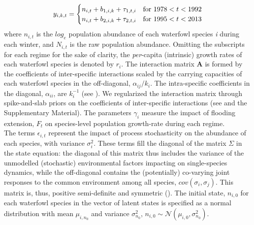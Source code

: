 \documentclass[12pt]{article}
\begin{document}
\begin{equation}\label{LVR_Obs_Equation_form}
	y_{i,k,t} = 
	\begin{cases}
		n_{i,t} + b_{1,i,k} + \tau_{1,t,i} & \text{for $ 1978 < t < 1992 $}\\
		n_{i,t} + b_{2,i,k} + \tau_{2,t,i} & \text{for $ 1995 < t < 2013 $}\\
	\end{cases}
\end{equation}
where $ n_{i,t} $ is the $log_{e}$ population abundance of each waterfowl species \textit{i} during each winter, and $ N_{i,t} $ is the raw population abundance. Omitting the subscripts for each regime for the sake of clarity, the \textit{per}-capita (intrinsic) growth rates of each waterfowl species is denoted by $ r_{i} $. The interaction matrix $ \mathbf{A} $ is formed by the coefficients of inter-specific interactions scaled by the carrying capacities of each waterfowl species in the off-diagonal, $ \alpha_{ij}/\textit{k}_{i} $. The intra-specific coefficients in the diagonal, $ \alpha_{ii} $, are $ \textit{k}_{i}^{-1} $ (see \cite{Ranta2006,Mutshinda2009,Almaraz2011}). We regularized the interaction matrix through spike-and-slab priors on the coefficients of inter-specific interactions (see \cite{Almaraz2012} and the Supplementary Material). The parameters $\gamma_{i}$ measure the impact of flooding extension, $F_{t}$ on species-level population growth-rate during each regime. \\

The terms $\epsilon_{i,t}$ represent the impact of process stochasticity on the abundance of each species, with variance $\sigma^2_{i}$. These terms fill the diagonal of the matrix $ \Sigma $ in the state equation: the diagonal of this matrix thus includes the variance of the unmodelled (stochastic) environmental factors impacting on single-species dynamics, while the off-diagonal contains the (potentially) co-varying joint responses to the common environment among all species, $ cov(\sigma_{i},\sigma_{j}) $. This matrix is, thus, positive semi-definite and symmetric (\cite{Almaraz2011,Almaraz2012}). The initial state, $ n_{i,0} $ for each waterfowl species in the vector of latent states is specified as a normal distribution with mean $ \mu_{i,n_{0}} $ and variance $ \sigma^2_{n_{0}} $, $ n_{i,0} \sim \mathcal{N}(\mu_{i,0}, \sigma^2_{n_{0}}) $.\\
\end{document}
